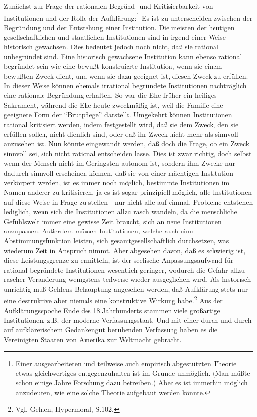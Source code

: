\documentclass[12pt,a4paper]{article}
\begin{document}
Zunächst zur Frage der rationalen Begründ- und Kritisierbarkeit von
Institutionen und der Rolle der Aufklärung:\footnote{Einer
ausgearbeiteten und teilweise auch empirisch abgestützten Theorie
etwas gleichwertiges entgegenzuhalten ist im Grunde unmöglich. (Man
müßte schon einige Jahre Forschung dazu betreiben.) Aber es ist
immerhin möglich anzudeuten, wie eine solche Theorie aufgebaut werden
könnte.} Es ist zu unterscheiden zwischen der Begründung und der
Entstehung einer Institution. Die meisten der heutigen
gesellschaftlichen und staatlichen Institutionen sind in irgend einer
Weise historisch gewachsen. Dies bedeutet jedoch noch nicht, daß sie
rational unbegründet sind. Eine historisch gewachsene Institution kann
ebenso rational begründet sein wie eine bewußt konstruierte
Institution, wenn sie einem bewußten Zweck dient, und wenn sie dazu
geeignet ist, diesen Zweck zu erfüllen. In dieser Weise können ehemals
irrational begründete Institutionen nachträglich eine rationale
Begründung erhalten. So war die Ehe früher ein heiliges Sakrament,
während die Ehe heute zweckmäßig ist, weil die Familie eine geeignete
Form der "`Brutpflege"' darstellt. Umgekehrt können Institutionen
rational kritisiert werden, indem festgestellt wird, daß sie dem
Zweck, den sie erfüllen sollen, nicht dienlich sind, oder daß ihr
Zweck nicht mehr als sinnvoll anzusehen ist. Nun könnte eingewandt
werden, daß doch die Frage, ob ein Zweck sinnvoll sei, sich nicht
rational entscheiden lasse. Dies ist zwar richtig, doch selbst wenn
der Mensch nicht im Geringsten autonom ist, sondern ihm Zwecke nur
dadurch sinnvoll erscheinen können, daß sie von einer mächtigen
Institution verkörpert werden, ist es immer noch möglich, bestimmte
Institutionen im Namen anderer zu kritisieren, ja es ist sogar
prinzipiell möglich, alle Institutionen auf diese Weise in Frage zu
stellen - nur nicht alle auf einmal. Probleme entstehen lediglich,
wenn sich die Institutionen allzu rasch wandeln, da die menschliche
Gefühlswelt immer eine gewisse Zeit braucht, sich an neue
Institutionen anzupassen. Außerdem müssen Institutionen, welche auch
eine Abstimmungsfunktion leisten, sich gesamtgesellschaftlich
durchsetzen, was wiederum Zeit in Anspruch nimmt. Aber abgesehen
davon, daß es schwierig ist, diese Leistungsgrenze zu ermitteln, ist
der seelische Anpassungsaufwand für rational begründete Institutionen
wesentlich geringer, wodurch die Gefahr allzu rascher Veränderung
wenigstens teilweise wieder ausgeglichen wird. Als historisch
unrichtig muß Gehlens Behauptung angesehen werden, daß Aufklärung
stets nur eine destruktive aber niemals eine konstruktive Wirkung
habe.\footnote{Vgl. Gehlen, Hypermoral, S.102.} Aus der
Aufklärungsepoche Ende des 18.Jahrhunderts stammen viele großartige
Institutionen, z.B. der moderne Verfassungsstaat. Und mit einer durch
und durch auf aufklärerischem Gedankengut beruhenden Verfassung haben
es die Vereinigten Staaten von Amerika zur Weltmacht gebracht.
\end{document}
